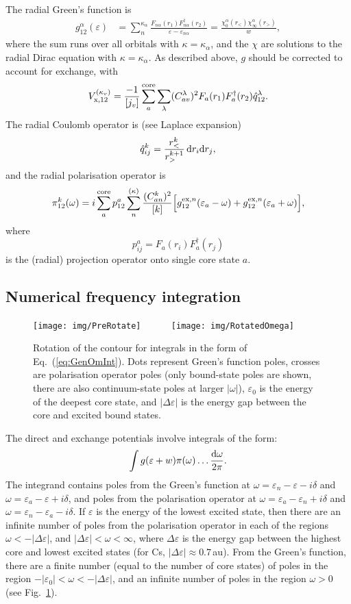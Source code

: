 \documentclass[10pt,twocolumn,a4paper]{article}%
\newcommand{\be}{\begin{equation}}
\newcommand{\ee}{\end{equation}}
\def\d{\ensuremath{{\rm d}}}
\def\en{\ensuremath{\varepsilon}}
\renewcommand{\a}{\ensuremath{\alpha}}
\renewcommand{\k}{\ensuremath{\kappa}}
\newcommand{\w}{\ensuremath{\omega}}
\begin{document}
The radial Green's function is
\begin{align}\label{eq:RadialGreen}
g^\a_{12}(\en) &= \sum_n^{\k_\a} \frac{F_{n\a}(r_1)F^\dag_{n\a}(r_2)}{\en-\en_{n\a}}
= \frac{\chi_0^\a(r_<)\chi_\infty^\a(r_>)}{w},
\end{align}
where the sum runs over all orbitals with $\k=\k_\a$, and the $\chi$ are solutions to the radial Dirac equation with $\k=\k_\a$.
As described above, $g$ should be corrected to account for exchange, with
\be\label{eq:RadialVx}
V_{\rm x,12}^{(\k_v)} = \frac{-1}{[j_v]}\sum_a^{\rm core}\sum_\lambda (C^\lambda_{av})^2F_a(r_1)F_a^\dag(r_2)\hat q^\lambda_{12}.
\ee
The radial Coulomb operator is (see Laplace expansion)
\be\label{eq:RadialQ}
\hat q^k_{ij} = \frac{r_<^k}{r_>^{k+1}} \, \d r_i\d r_j,
\ee
and the radial polarisation operator is
\begin{multline}\label{eq:RadialPolarisation}
\pi_{12}^{k}(\w) = i\sum_{a}^{\rm core}p^a_{12}\sum_{n}^{(\kappa)} \frac{(C^k_{an})^2}{[k]}
\Big[g_{12}^{{\rm ex},n}(\en_{a}-\w)
+g_{12}^{{\rm ex},n}(\en_{a}+\w)
\Big],
\end{multline}
where 
\[
p^a_{ij} = F_a(r_i)F^\dag_a(r_j)
\]
is the (radial) projection operator onto single core state $a$.



\subsection{Numerical frequency integration}


\begin{figure}%
\centering%
\texttt{[image: img/PreRotate]}~~
\raisebox{14\height}{${\to}$}~~~
\texttt{[image: img/RotatedOmega]}%
\caption{\small Rotation of the contour for integrals in the form of Eq.~(\ref{eq:GenOmInt}).
Dots represent Green's function poles, crosses are polarisation operator poles (only bound-state poles are shown, there are also continuum-state poles at larger $|\w|$),
$\en_0$ is the energy of the deepest core state, and $|\Delta\en|$ is the energy gap between the core and excited bound states.
\label{fig:contourRotate}}
\end{figure}


The direct and exchange potentials involve integrals of the form:
\be\label{eq:GenOmInt}
\int g(\en+w)\pi(\w)\ldots \frac{\d\w}{2\pi}.
\ee
The integrand contains poles from the Green's function at 
$\w=\en_n-\en-i\delta$ and $\w=\en_a-\en+i\delta$,
and poles from the polarisation operator at 
$\w=\en_a-\en_n+i\delta$ and $\w=\en_n-\en_a-i\delta$.
If $\en$ is the energy of the lowest excited state, then
there are an infinite number of poles from the polarisation operator in each of the regions $\w<-|\Delta\en|$, and $|\Delta\en|<\w<\infty$,
where $\Delta\en$ is the energy gap between the highest core and lowest excited states (for Cs, $|\Delta\en|\approx0.7$\,au).
From the Green's function, there are a finite number (equal to the number of core states) of poles in the region
$-|\en_0|<\w<-|\Delta\en|$, and an infinite number of poles in the region $\w>0$ (see Fig.~\ref{fig:contourRotate}).
\end{document}
